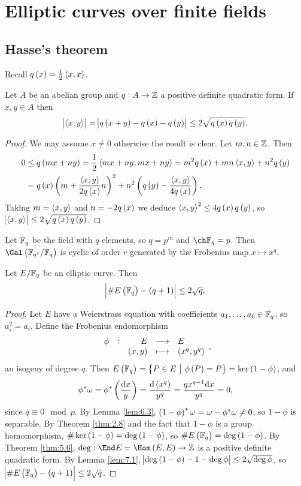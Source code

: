 \pagebreak

\section{Elliptic curves over finite fields}

\subsection{Hasse's theorem}

Recall $ q\br{x} = \tfrac{1}{2}\abr{x, x} $.

\begin{lemma}
\label{lem:7.1}
Let $ A $ be an abelian group and $ q : A \to \mathbb{Z} $ a positive definite quadratic form. If $ x, y \in A $ then
$$ \abs{\abr{x, y}} = \abs{q\br{x + y} - q\br{x} - q\br{y}} \le 2\sqrt{q\br{x}q\br{y}}. $$
\end{lemma}

\begin{proof}
We may assume $ x \ne 0 $ otherwise the result is clear. Let $ m, n \in \mathbb{Z} $. Then
\begin{align*}
0
& \le q\br{mx + ny}
= \dfrac{1}{2}\abr{mx + ny, mx + ny}
= m^2q\br{x} + mn\abr{x, y} + n^2q\br{y} \\
& = q\br{x}\br{m + \dfrac{\abr{x, y}}{2q\br{x}}n}^2 + n^2\br{q\br{y} - \dfrac{\abr{x, y}}{4q\br{x}}}.
\end{align*}
Taking $ m = \left\langle x, y \right\rangle $ and $ n = -2q\br{x} $ we deduce $ \abr{x, y}^2 \le 4q\br{x}q\br{y} $, so $ \abs{\abr{x, y}} \le 2\sqrt{q\br{x}q\br{y}} $.
\end{proof}

Let $ \mathbb{F}_q $ be the field with $ q $ elements, so $ q = p^m $ and $ \ch \FF_q = p $. Then $ \Gal\br{\FF_{q^r} / \FF_q} $ is cyclic of order $ r $ generated by the Frobenius map $ x \mapsto x^q $.

\begin{theorem}[Hasse]
Let $ E / \mathbb{F}_q $ be an elliptic curve. Then
$$ \abs{\#E\br{\FF_q} - \br{q + 1}} \le 2\sqrt{q}. $$
\end{theorem}

\begin{proof}
Let $ E $ have a Weierstrass equation with coefficients $ a_1, \dots, a_6 \in \mathbb{F}_q $, so $ a_i^q = a_i $. Define the Frobenius endomorphism
$$ \function[\phi]{E}{E}{\br{x, y}}{\br{x^q, y^q}}, $$
an isogeny of degree $ q $. Then $ E\br{\FF_q} = \cbr{P \in E \st \phi\br{P} = P} = \ker \br{1 - \phi} $, and
$$ \phi^*\omega = \phi^*\br{\dfrac{\d x}{y}} = \dfrac{\d\br{x^q}}{y^q} = \dfrac{qx^{q - 1}\d x}{y^q} = 0, $$
since $ q \equiv 0 \mod p $. By Lemma \ref{lem:6.3}, $ \br{1 - \phi}^*\omega = \omega - \phi^*\omega \ne 0 $, so $ 1 - \phi $ is separable. By Theorem \ref{thm:2.8} and the fact that $ 1 - \phi $ is a group homomorphism, $ \#\ker \br{1 - \phi} = \deg \br{1 - \phi} $, so $ \#E\br{\FF_q} = \deg \br{1 - \phi} $. By Theorem \ref{thm:5.6}, $ \deg : \End E = \Hom\br{E, E} \to \ZZ $ is a positive definite quadratic form. By Lemma \ref{lem:7.1}, $ \abs{\deg \br{1 - \phi} - 1 - \deg \phi} \le 2\sqrt{\deg \phi} $, so $ \abs{\#E\br{\FF_q} - \br{q + 1}} \le 2\sqrt{q} $.
\end{proof}

